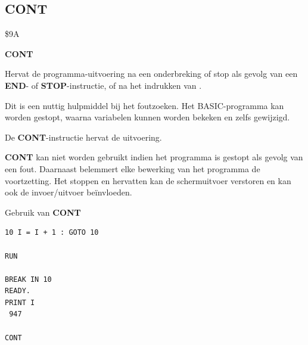 
\newpage
\subsection{CONT}
\begin{description}[leftmargin=2cm,style=nextline]
\item [Token:]   \$9A

\item [Formaat:]  {\bf CONT}

\item [Gebruik:]   Hervat de programma-uitvoering na een onderbreking of stop als gevolg van een {\bf END}- of {\bf STOP}-instructie, of na het indrukken van .

                 Dit is een nuttig hulpmiddel bij het foutzoeken. Het BASIC-programma kan worden gestopt, waarna variabelen kunnen worden bekeken en zelfs gewijzigd.

                 De {\bf CONT}-instructie hervat de uitvoering.

\item [Opmerkingen:] {\bf CONT} kan niet worden gebruikt indien het programma is gestopt als gevolg van een fout. Daarnaast belemmert elke bewerking van het programma de voortzetting. Het stoppen en hervatten kan de schermuitvoer verstoren en kan ook de invoer/uitvoer beïnvloeden.

\item [Voorbeeld:] Gebruik van {\bf CONT}

\begin{tcolorbox}[colback=black,coltext=white]
\verbatimfont{\codefont}
\begin{verbatim}
10 I = I + 1 : GOTO 10

RUN

BREAK IN 10
READY.
PRINT I
 947

CONT
\end{verbatim}
\end{tcolorbox}
\end{description}


\newpage
